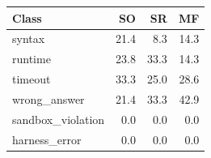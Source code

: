 \begin{tabular}{@{}lrrr@{}}
\toprule
Class & SO & SR & MF \\
\midrule
syntax & 21.4 & 8.3 & 14.3 \\
runtime & 23.8 & 33.3 & 14.3 \\
timeout & 33.3 & 25.0 & 28.6 \\
wrong_answer & 21.4 & 33.3 & 42.9 \\
sandbox_violation & 0.0 & 0.0 & 0.0 \\
harness_error & 0.0 & 0.0 & 0.0 \\
\bottomrule
\end{tabular}
